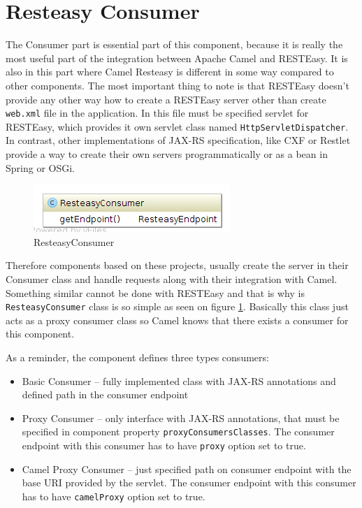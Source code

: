 \documentclass[12pt,final,oneside]{fithesis2}
\begin{document}
\section{Resteasy Consumer}\label{consumer}
The Consumer part is essential part of this component, because it is really the most useful part of the integration between Apache Camel and RESTEasy. It is also in this part where Camel Resteasy is different in some way compared to other components. The most important thing to note is that RESTEasy doesn't provide any other way how to create a RESTEasy server other than create \texttt{web.xml} file in the application. In this file must be specified servlet for RESTEasy, which provides it own servlet class named \texttt{HttpServletDispatcher}. In contrast, other implementations of JAX-RS specification, like CXF or Restlet provide a way to create their own servers programmatically or as a bean in Spring or OSGi.

\begin{figure}[!h]
\centering
\includegraphics[width=0.6\linewidth]{images/consumer.png}
\caption{ResteasyConsumer}
\label{fig-consumer}
\end{figure}

Therefore components based on these projects, usually create the server in their Consumer class and handle requests along with their integration with Camel. Something similar cannot be done with RESTEasy and that is why is \texttt{ResteasyConsumer} class is so simple as seen on figure \ref{fig-consumer}. Basically this class just acts as a proxy consumer class so Camel knows that there exists a consumer for this component.

As a reminder, the component defines three types consumers:
\begin{itemize}
\item
Basic Consumer  -- fully implemented class with JAX-RS annotations and defined path in the consumer endpoint

\item
Proxy Consumer -- only interface with JAX-RS annotations, that must be specified in component property \texttt{proxyConsumersClasses}. The consumer endpoint with this consumer has to have \texttt{proxy} option set to true. 

\item
Camel Proxy Consumer -- just specified path on consumer endpoint with the base URI provided by the servlet. The consumer endpoint with this consumer has to have \texttt{camelProxy} option set to true. 
\end{itemize}
\end{document}
